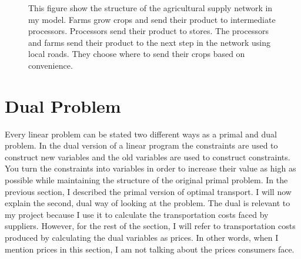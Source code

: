 \documentclass{report}
\begin{document}
\begin{figure}
\centering
\begin{framed}
\caption{This figure show the structure of the agricultural supply network in my model. Farms grow crops and send their product to intermediate processors. Processors send their product to stores. The processors and farms send their product to the next step in the network using local roads. They choose where to send their crops based on convenience.}
\label{fig:spec}
\end{framed}
\end{figure}

\section{Dual Problem}

Every linear problem can be stated two different ways as a primal and dual problem. In the dual version of a linear program the constraints are used to construct new variables and the old variables are used to construct constraints. You turn the constraints into variables in order to increase their value as high as possible while maintaining the structure of the original primal problem. In the previous section, I described the primal version of optimal transport. I will now explain the second, dual way of looking at the problem. The dual is relevant to my project because I use it to calculate the transportation costs faced by suppliers. However, for the rest of the section, I will refer to transportation costs produced by calculating the dual variables as prices. In other words, when I mention prices in this section, I am not talking about the prices consumers face. 
\end{document}
